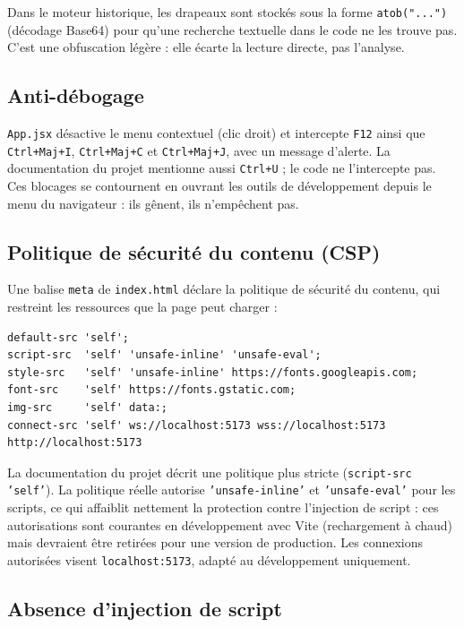 \documentclass[11pt,a4paper]{report}
\newcommand{\file}[1]{\texttt{\nolinkurl{#1}}}
\begin{document}
Dans le moteur historique, les drapeaux sont stock\'es sous la forme \texttt{atob("...")}
(d\'ecodage Base64) pour qu'une recherche textuelle dans le code ne les trouve pas.
C'est une obfuscation l\'eg\`ere : elle \'ecarte la lecture directe, pas l'analyse.

\subsection{Anti-d\'ebogage}

\file{App.jsx} d\'esactive le menu contextuel (clic droit) et intercepte \texttt{F12} ainsi
que \texttt{Ctrl+Maj+I}, \texttt{Ctrl+Maj+C} et \texttt{Ctrl+Maj+J}, avec un message
d'alerte. La documentation du projet mentionne aussi \texttt{Ctrl+U} ; le code
ne l'intercepte pas. Ces blocages se contournent en ouvrant les outils de d\'eveloppement
depuis le menu du navigateur : ils g\^enent, ils n'emp\^echent pas.

\subsection{Politique de s\'ecurit\'e du contenu (CSP)}

Une balise \texttt{meta} de \file{index.html} d\'eclare la politique de s\'ecurit\'e du
contenu, qui restreint les ressources que la page peut charger :

\begin{lstlisting}[style=plain,caption={CSP r\'eelle de \file{frontend/index.html}}]
default-src 'self';
script-src  'self' 'unsafe-inline' 'unsafe-eval';
style-src   'self' 'unsafe-inline' https://fonts.googleapis.com;
font-src    'self' https://fonts.gstatic.com;
img-src     'self' data:;
connect-src 'self' ws://localhost:5173 wss://localhost:5173 http://localhost:5173
\end{lstlisting}

La documentation du projet d\'ecrit une politique plus stricte (\texttt{script-src
'self'}). La politique r\'eelle autorise \texttt{'unsafe-inline'} et
\texttt{'unsafe-eval'} pour les scripts, ce qui affaiblit nettement la protection contre
l'injection de script : ces autorisations sont courantes en d\'eveloppement avec Vite
(rechargement \`a chaud) mais devraient \^etre retir\'ees pour une version de production.
Les connexions autoris\'ees visent \texttt{localhost:5173}, adapt\'e au d\'eveloppement
uniquement.

\subsection{Absence d'injection de script}
\end{document}

